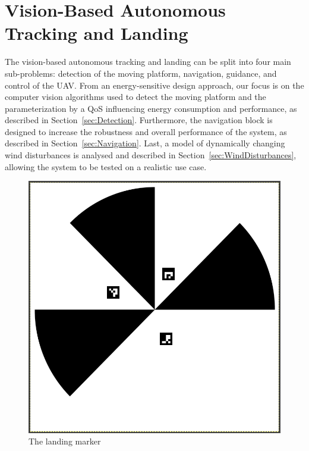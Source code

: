\documentclass[conference, onecolumn, draftclsnofoot]{IEEEtran}
\begin{document}
\section{Vision-Based Autonomous Tracking and Landing}
\label{sec:landing}

The vision-based autonomous tracking and landing can be split into
four main sub-problems: detection of the moving platform, navigation,
guidance, and control of the UAV. From an energy-sensitive design
approach, our focus is on the computer vision algorithms used to
detect the moving platform and the parameterization by a QoS
influencing energy consumption and performance, as described in
Section~\ref{sec:Detection}. Furthermore, the navigation block is
designed to increase the robustness and overall performance of the
system, as described in Section~\ref{sec:Navigation}. Last, a model of
dynamically changing wind disturbances is analysed and described in
Section~\ref{sec:WindDisturbances}, allowing the system to be tested
on a realistic use case.



\begin{figure}
\centering
\includegraphics[scale=0.15]{n-fold-for-landing.png}
\caption{The landing marker}
\label{fig:LandingMarker}
\end{figure}
\end{document}
